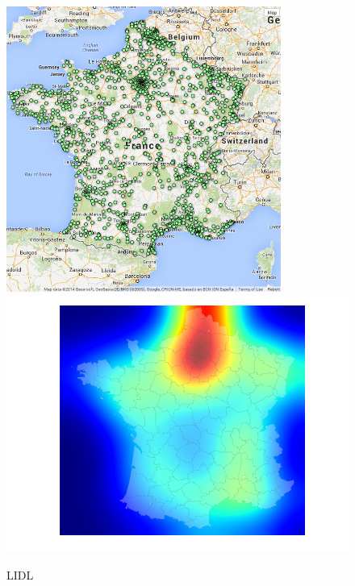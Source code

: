 \documentclass[11pt]{article}
\begin{document}
\begin{figure}[H]
    \caption{LIDL}
	\centering
		\includegraphics[width=9cm]{images/maps_group_dots/LIDL.png}
        \includegraphics[width=12.8cm]{images/maps_group_heatmaps/LIDL.png}
\end{figure}
\end{document}
